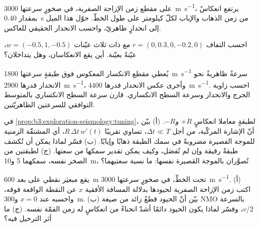 \begin{exercise}[$\star\star$]\label{exo:b3:exploration-seismology:8}
على مقطع زمن الإزاحة الصفرية، في صخورٍ سرعتها \qty{3000}{m.s^{-1}}، يرتفع انعكاسٌ
بمقدار \qty{0.40}{s} من زمن الذهاب والإياب لكلّ كيلومتر على طول الخطّ. حوّل هذا
الميل إلى انحدارٍ ظاهريّ، واحسب الانحدار الحقيقي للعاكس.
\end{exercise}

\begin{exercise}[$\star\star$]\label{exo:b3:exploration-seismology:9}
احسب التفاف  $r = (0, 0.3, 0, -0.2, 0)$ مع
 ذات ثلاث عيّنات $w = (-0.5, 1, -0.5)$، عيّنةً بعيّنة. أين يقع
الانعكاسان، وهل يتداخلان؟
\end{exercise}

\begin{exercise}[$\star\star\star$]\label{exo:b3:exploration-seismology:10}
يُعطي مقطع الانكسار المعكوس فوق طبقةٍ سرعتها \qty{1800}{m.s^{-1}} سرعةً ظاهريةً
نحو الانحدار قدرها \qty{2900}{m.s^{-1}}، وأخرى عكس الانحدار قدرها
\qty{4400}{m.s^{-1}}. احسب زاوية الحرج والانحدار وسرعة
السطح الانكساري. قارن سرعة السطح الانكساري بالمتوسط التوافقي للسرعتين
الظاهريّتين.
\end{exercise}

\begin{exercise}[$\star\star\star$]\label{exo:b3:exploration-seismology:11}
في \cref{prop:b3:exploration-seismology:tuning}، لطبقةٍ
معاملا انعكاسٍ $+R$ و$-R$. (أ) بيّن أنّ الإشارة المركّبة، من أجل $\Delta t \ll T$،
تساوي تقريبًا $R\,\Delta t\,w'(t)$، أي المشتقّة الزمنية للموجة القصيرة
مضروبةً في سمك الطبقة ذهابًا وإيابًا. (ب) فسّر لماذا يمكن أن تُكشف طبقةٌ رقيقة
وإن لم تُفصَل، وكيف يمكن تقدير سمكها من
سعتها. (ج) لطبقتين من الصخر نفسه، سمكهما 5 و\qty{10}{m}، تُصوَّران
بالموجة القصيرة نفسها: ما نسبة سعتيهما؟
\end{exercise}

\begin{exercise}[$\star\star\star$]\label{exo:b3:exploration-seismology:12}
يقع مبعثِر نقطي على بعد \qty{600}{m} تحت الخطّ، في صخورٍ
سرعتها \qty{3000}{m.s^{-1}}. (أ) اكتب زمن الإزاحة الصفرية لحيودها بدلالة
المسافة الأفقية $x$ عن النقطة الواقعة فوقه، واحسبه عند $x = 0$
و\qty{300}{m}. (ب) بيّن أنّ الحيود قطعٌ زائد من صيغة NMO
بالسرعة $v/2$، وفسّر لماذا يكون الحيود دائمًا أشدّ انحناءً من
انعكاسٍ له زمن القمّة نفسه. (ج) ما أثر الترحيل فيه؟
\end{exercise}

